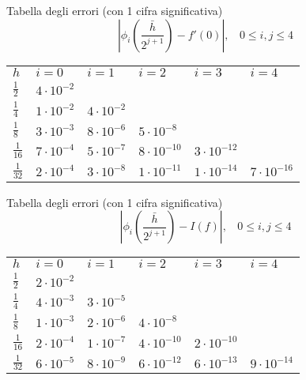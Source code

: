 \documentclass[12pt,a4paper]{article}
\begin{document}
Tabella degli errori (con 1 cifra significativa)
\begin{equation*}
    |\phi_i(\frac{\bar{h}}{2^{j+1}})-f'(0)|,\  \  \  \ 0\leq i,j\leq4
\end{equation*}

\begin{table}[H]
\centering
\begin{tabular}{llllll}
$h$ & $i=0$ & $i=1$ & $i=2$ & $i=3$ & $i=4$ \\  \cline{1-6} 

$\frac{1}{2}$ & $4\cdot10^{-2}$ \\ 

$\frac{1}{4}$ & $1\cdot10^{-2}$ & $4\cdot10^{-2}$  \\

$\frac{1}{8}$ & $3\cdot10^{-3}$ & $8\cdot10^{-6}$ & $5\cdot10^{-8}$ \\

$\frac{1}{16}$ & $7\cdot10^{-4}$ & $5\cdot10^{-7}$ & $8\cdot10^{-10}$ & $3\cdot10^{-12}$  \\

$\frac{1}{32}$ & $2\cdot10^{-4}$ & $3\cdot10^{-8}$ & $1\cdot10^{-11}$ & $1\cdot10^{-14}$ & $7\cdot10^{-16}$ \\

\end{tabular}
\end{table}

Tabella degli errori (con 1 cifra significativa)
\begin{equation*}
    |\phi_i(\frac{\bar{h}}{2^{j+1}})-I(f)|,\  \  \  \ 0\leq i,j\leq4
\end{equation*}
\begin{table}[H]
\centering
\begin{tabular}{llllll}
$h$ & $i=0$ & $i=1$ & $i=2$ & $i=3$ & $i=4$ \\  \cline{1-6} 

$\frac{1}{2}$ & $2\cdot10^{-2}$ \\ 

$\frac{1}{4}$ & $4\cdot10^{-3}$ & $3\cdot10^{-5}$  \\

$\frac{1}{8}$ & $1\cdot10^{-3}$ & $2\cdot10^{-6}$ & $4\cdot10^{-8}$ \\

$\frac{1}{16}$ & $2\cdot10^{-4}$ & $1\cdot10^{-7}$ & $4\cdot10^{-10}$ & $2\cdot10^{-10}$  \\

$\frac{1}{32}$ & $6\cdot10^{-5}$ & $8\cdot10^{-9}$ & $6\cdot10^{-12}$ & $6\cdot10^{-13}$ & $9\cdot10^{-14}$ \\

\end{tabular}
\end{table}
\end{document}
